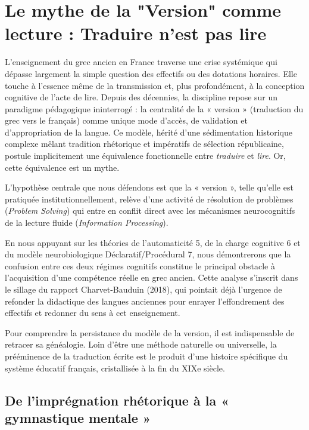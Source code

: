 

\section{Le mythe de la "Version" comme lecture : Traduire n'est pas lire}

L'enseignement du grec ancien en France traverse une crise systémique qui dépasse largement la
simple question des effectifs ou des dotations horaires. Elle touche à l'essence même de la
transmission et, plus profondément, à la conception cognitive de l'acte de lire. Depuis des
décennies, la discipline repose sur un paradigme pédagogique ininterrogé : la centralité de la «
version » (traduction du grec vers le français) comme unique mode d'accès, de validation et
d'appropriation de la langue.\cite{II-3-1-ref1} Ce modèle, hérité d'une sédimentation historique
complexe mêlant tradition rhétorique et impératifs de sélection républicaine, postule implicitement
une équivalence fonctionnelle entre \textit{traduire} et \textit{lire}. Or, cette équivalence est un
mythe.

L'hypothèse centrale que nous défendons est que la «
version », telle qu'elle est pratiquée institutionnellement, relève d'une activité de résolution de
problèmes (\textit{Problem Solving}) qui entre en conflit direct avec les mécanismes neurocognitifs
de la lecture fluide (\textit{Information Processing}).\cite{II-3-1-ref3}

En nous appuyant sur les théories de l'automaticité 5, de la charge cognitive 6 et du modèle
neurobiologique Déclaratif/Procédural 7, nous démontrerons que la confusion entre ces deux régimes
cognitifs constitue le principal obstacle à l'acquisition d'une compétence réelle en grec ancien.
Cette analyse s'inscrit dans le sillage du rapport Charvet-Bauduin (2018), qui pointait déjà
l'urgence de refonder la didactique des langues anciennes pour enrayer l'effondrement des effectifs
et redonner du sens à cet enseignement.\cite{II-3-1-ref8}

Pour comprendre la persistance du modèle de la version, il est indispensable de retracer sa
généalogie. Loin d'être une méthode naturelle ou universelle, la prééminence de la traduction écrite
est le produit d'une histoire spécifique du système éducatif français, cristallisée à la fin du XIXe
siècle.



\subsection{De l'imprégnation rhétorique à la « gymnastique mentale »}

